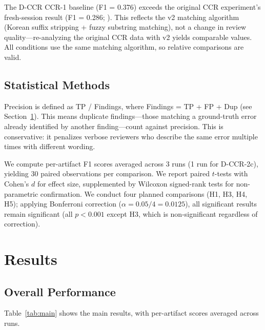 \documentclass[11pt]{article}
\begin{document}
The D-CCR CCR-1 baseline (F1 = 0.376) exceeds the original CCR experiment's fresh-session result (F1 = 0.286; \citealp{song2026ccr}).
This reflects the v2 matching algorithm (Korean suffix stripping + fuzzy substring matching), not a change in review quality---re-analyzing the original CCR data with v2 yields comparable values.
All conditions use the same matching algorithm, so relative comparisons are valid.

\subsection{Statistical Methods}

Precision is defined as TP / Findings, where Findings = TP + FP + Dup (see Section~\ref{sec:results}).
This means duplicate findings---those matching a ground-truth error already identified by another finding---count against precision.
This is conservative: it penalizes verbose reviewers who describe the same error multiple times with different wording.

We compute per-artifact F1 scores averaged across 3 runs (1 run for D-CCR-2c), yielding 30 paired observations per comparison.
We report paired $t$-tests with Cohen's $d$ for effect size, supplemented by Wilcoxon signed-rank tests for non-parametric confirmation.
We conduct four planned comparisons (H1, H3, H4, H5); applying Bonferroni correction ($\alpha = 0.05/4 = 0.0125$), all significant results remain significant (all $p < 0.001$ except H3, which is non-significant regardless of correction).

\section{Results}
\label{sec:results}

\subsection{Overall Performance}

Table~\ref{tab:main} shows the main results, with per-artifact scores averaged across runs.
\end{document}
